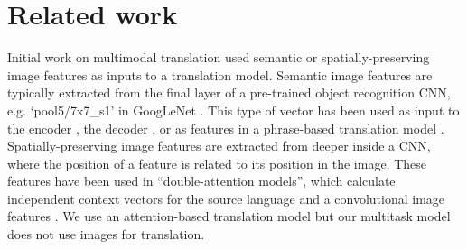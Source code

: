 \section{Related work}



Initial work on multimodal translation used semantic or spatially-preserving image features as inputs to a translation model. Semantic image features are typically extracted from the final layer of a pre-trained object recognition CNN, e.g.
`pool5/7x7\_s1' in GoogLeNet \citep{Szegedy2015}. This type of vector has been used as input to the encoder \cite{ElliottFrankHasler2015,Huang2016}, the decoder \citep{Libovicky2016}, or as features in a phrase-based
translation model \citep{Shah2016,Hitschler2016}.
Spatially-preserving image features are extracted from deeper inside a CNN, where the position of a feature is related to its position in the image. These features have
been used in ``double-attention models'', which calculate independent context vectors for the source language and a
convolutional image features
\citep{Calixto2016,Caglayan2016b,Calixto2017c}.
We use an attention-based translation model but our multitask model does not use images for translation.

